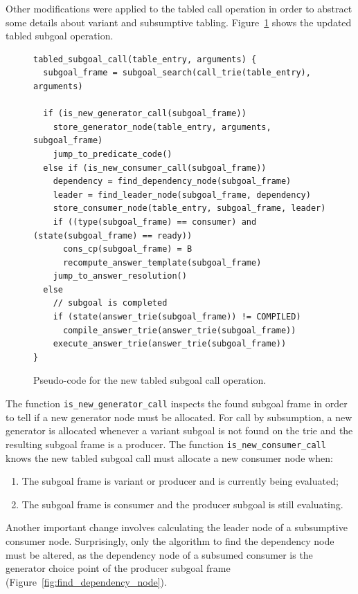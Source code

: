 Other modifications were applied to the tabled call operation in order to abstract some details about
variant and subsumptive tabling. Figure~\ref{fig:tabled_subgoal_call_new} shows the updated tabled
subgoal operation.

\begin{figure}[ht]
\begin{Verbatim}
tabled_subgoal_call(table_entry, arguments) {
  subgoal_frame = subgoal_search(call_trie(table_entry), arguments)
  
  if (is_new_generator_call(subgoal_frame))
    store_generator_node(table_entry, arguments, subgoal_frame)
    jump_to_predicate_code()
  else if (is_new_consumer_call(subgoal_frame))
    dependency = find_dependency_node(subgoal_frame)
    leader = find_leader_node(subgoal_frame, dependency)
    store_consumer_node(table_entry, subgoal_frame, leader)
    if ((type(subgoal_frame) == consumer) and (state(subgoal_frame) == ready))
      cons_cp(subgoal_frame) = B
      recompute_answer_template(subgoal_frame)
    jump_to_answer_resolution()
  else
    // subgoal is completed
    if (state(answer_trie(subgoal_frame)) != COMPILED)
      compile_answer_trie(answer_trie(subgoal_frame))
    execute_answer_trie(answer_trie(subgoal_frame))
}
\end{Verbatim}
\caption{Pseudo-code for the new tabled subgoal call operation.}
\label{fig:tabled_subgoal_call_new}
\end{figure}

The function \texttt{is\_new\_generator\_call} inspects the found
subgoal frame in order to tell if a new generator node must be allocated.
For call by subsumption, a new generator is allocated whenever a variant subgoal is not found
on the trie and the resulting subgoal frame is a producer.
The function \texttt{is\_new\_consumer\_call} knows the new tabled subgoal call must allocate
a new consumer node when:

\begin{enumerate}
  \item The subgoal frame is variant or producer and is currently being evaluated;
  \item The subgoal frame is consumer and the producer subgoal is still evaluating.
\end{enumerate}

Another important change involves calculating the leader node of a subsumptive consumer node.
Surprisingly, only the algorithm to find the dependency node must be altered, as
the dependency node of a subsumed consumer is the generator choice point of
the producer subgoal frame (Figure~\ref{fig:find_dependency_node}).  

